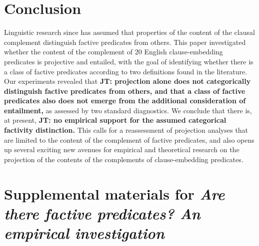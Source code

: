 \documentclass[11pt,fleqn]{article}
\newcommand{\6}{\mbox{$[\hspace*{-.6mm}[$}}
\newcommand{\9}{\mbox{$]\hspace*{-.6mm}]$}}
\newcommand{\jt}[1]{\textbf{\color{blue}JT: #1}}
\begin{document}
\section{Conclusion}\label{s5}

Linguistic research since \citealt{kiparsky-kiparsky70} has assumed that properties of the content of the clausal complement distinguish factive predicates from others. This paper investigated whether the content of the complement of 20 English clause-embedding predicates is projective and entailed, with the goal of identifying whether there is a class of factive predicates according to two definitions found in the literature. Our experiments revealed that \jt{projection alone does not categorically distinguish factive predicates from others, and that a class of factive predicates also does not emerge from the additional consideration of entailment,} as assessed by two standard diagnostics. We conclude that there is, at present, \jt{no empirical support for the assumed categorical factivity distinction.} This calls for a reassessment of projection analyses that are limited to the content of the complement of factive predicates, and also opens up several exciting new avenues for empirical and theoretical research on the projection of the contents of the complements of clause-embedding predicates.





\newpage

\section*{Supplemental materials for {\em Are there factive predicates? An empirical investigation}}

\appendix

\setcounter{page}{1}

\setcounter{table}{0}
\renewcommand{\thetable}{A\arabic{table}}

\setcounter{figure}{0}
\renewcommand{\thefigure}{A\arabic{figure}}
\end{document}
